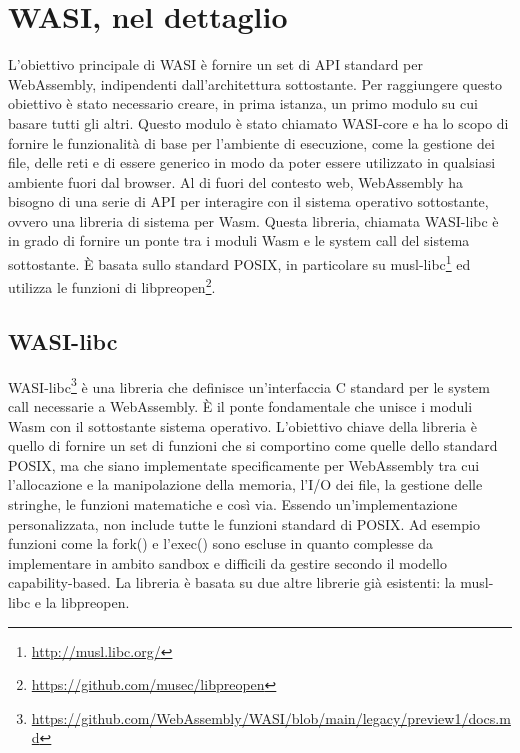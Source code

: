 \chapter{WASI, nel dettaglio}
\label{chap:wasi-in-depth}
L'obiettivo principale di WASI è fornire un set di API standard per WebAssembly, indipendenti dall'architettura
sottostante. Per raggiungere questo obiettivo è stato necessario creare, in prima istanza, un primo modulo su cui basare
tutti gli altri. Questo modulo è stato chiamato WASI-core e ha lo scopo di fornire le funzionalità di base per
l'ambiente di esecuzione, come la gestione dei file, delle reti e di essere generico in modo da poter essere utilizzato
in qualsiasi ambiente fuori dal browser. Al di fuori del contesto web, WebAssembly ha bisogno di una serie di API per
interagire con il sistema operativo sottostante, ovvero una libreria di sistema per Wasm. Questa libreria, chiamata
WASI-libc è in grado di fornire un ponte tra i moduli Wasm e le system call del sistema sottostante. È basata sullo
standard POSIX\cite{posix-standard}, in particolare su musl-libc\footnote{\url{http://musl.libc.org/}} ed utilizza le funzioni di
libpreopen\footnote{\url{https://github.com/musec/libpreopen}}.

\section{WASI-libc}
WASI-libc\footnote{\url{https://github.com/WebAssembly/WASI/blob/main/legacy/preview1/docs.md}} è una libreria che
definisce un'interfaccia C standard per le system call necessarie a WebAssembly. È il ponte fondamentale che unisce i
moduli Wasm con il sottostante sistema operativo. L'obiettivo chiave della libreria è quello di fornire un set di
funzioni che si comportino come quelle dello standard POSIX, ma che siano implementate specificamente per WebAssembly
tra cui l'allocazione e la manipolazione della memoria, l'I/O dei file, la gestione delle stringhe, le funzioni
matematiche e così via. Essendo un'implementazione personalizzata, non include tutte le funzioni standard di POSIX. Ad
esempio funzioni come la fork() e l'exec() sono escluse in quanto complesse da implementare in ambito sandbox e
difficili da gestire secondo il modello capability-based. La libreria è basata su due altre librerie già esistenti: la
musl-libc e la libpreopen.

